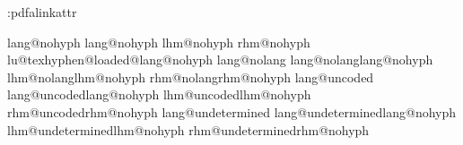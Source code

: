 \def\formulasource:none#1{}
\def\formulasource:both#1{%
    \formulasource:actualtext{#1}%
    \formulasource:attachment{#1}}



\def\nameddestination{\ifhmode\expandafter\linkdest:h\else\expandafter\linkdest:v\fi}
\def\linkdest:h#1{\vadjust pre{\linkdest:v{#1}}}
\def\linkdest:v#1{\pdfextension dest name {#1} xyz\nobreak}

\protected{}
\protected{}
\protected{}

\def\minim:linkattr{\the\hyperlinkstyle\the\minim:pdfalinkattr}
\newtoks\hyperlinkstyle
\newtoks\minim:pdfalinkattr



\def\newnamedlanguage#1#2#3{%
    \expandafter\newlanguage\csname lang@#1\endcsname
    \expandafter\chardef\csname lhm@#1\endcsname=#2\relax
    \expandafter\chardef\csname rhm@#1\endcsname=#3\relax
    \csname lu@texhyphen@loaded@\the\csname lang@#1\endcsname\endcsname}

\def\newnameddialect#1#2{%
    \expandafter\chardef\csname lang@#2\endcsname\csname lang@#1\endcsname
    \expandafter\chardef\csname lhm@#2\endcsname\csname lhm@#1\endcsname
    \expandafter\chardef\csname rhm@#2\endcsname\csname rhm@#1\endcsname}

\ifcsname lang@nohyph\endcsname \else
    \newnamedlanguage {nohyph} 1 1 \fi
\ifcsname lang@nolang\endcsname \else
    \newnameddialect {nohyph} {nolang} \fi
\ifcsname lang@uncoded\endcsname \else
    \newnameddialect {nohyph} {uncoded} \fi
\ifcsname lang@undetermined\endcsname \else
    \newnameddialect {nohyph} {undetermined} \fi



